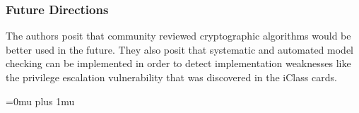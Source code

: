 \subsubsection{Future Directions}

\noindent
The authors posit that community reviewed cryptographic algorithms would be better used in the future.  They also posit that systematic and automated model checking can be implemented in order to detect implementation weaknesses like the privilege escalation vulnerability that was discovered in the iClass cards.

\Urlmuskip=0mu plus 1mu\relax
\pagebreak
